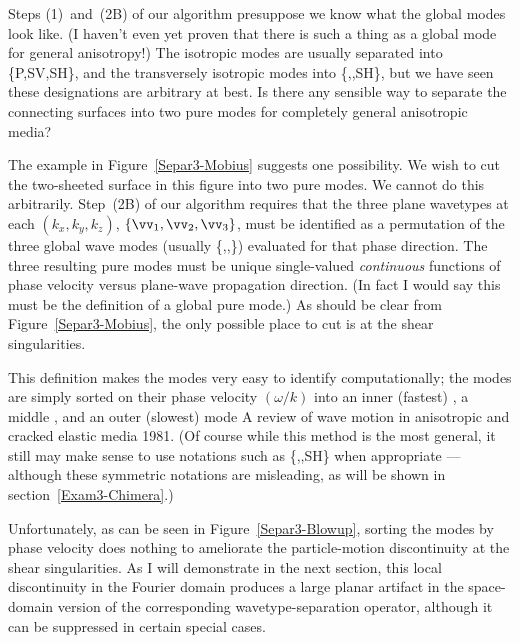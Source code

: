 Steps (1)~and~(2B) of our algorithm presuppose we know what the
global {\qS} modes look like. (I haven't even yet proven that there
is such a thing as a global {\qS} mode for general anisotropy!)
The isotropic modes are usually separated into
\{P,SV,SH\}, and the transversely isotropic modes into
\{\qP,\qSV,SH\}, but we have seen these designations are arbitrary
at best.  Is there any sensible way to
separate the connecting {\qS} surfaces into two {\qS} pure modes
for completely general anisotropic media?

The example in Figure~\ref{Separ3-Mobius} suggests one possibility.
We wish to cut the two-sheeted {\qS} surface in this figure
into two pure modes.
We cannot do this arbitrarily.
Step~(2B) of our algorithm requires that the three
plane wavetypes at each $(k_x,k_y,k_z)$,
$ \{ {\vv}_1, {\vv}_2, {\vv}_3 \} $,
must be identified as a permutation of
the three global wave modes
(usually \{{\qP},{},{}\})
evaluated for that phase direction.
The three resulting pure modes must be
unique single-valued {\em continuous} functions of phase velocity versus
plane-wave propagation direction.
(In fact I would say this must be the definition of a global pure mode.)
As should be clear from Figure~\ref{Separ3-Mobius},
the only possible place to cut is at the shear singularities.

This definition makes the modes very easy to identify
computationally; the modes are simply sorted on their phase velocity
\label{Separ3-speedorder}
$(\omega / k )$ into an inner (fastest) {\qP},
a middle {}, and an outer (slowest) {} mode
{A review of wave motion in anisotropic and cracked elastic media}
{1981}.
(Of course while this method is the most general, it still may make
sense to use notations such as \{\qP,\qSV,SH\} when appropriate ---
although these symmetric notations are misleading, as will be shown
in section~\ref{Exam3-Chimera}.)

Unfortunately, as can be seen in Figure~\ref{Separ3-Blowup},
sorting the modes by phase velocity
does nothing to ameliorate the particle-motion discontinuity
at the shear singularities. As I will demonstrate in the next section,
this local discontinuity in the Fourier
domain produces a large planar artifact in the space-domain version
of the corresponding wavetype-separation operator, although
it can be suppressed in certain special cases.

